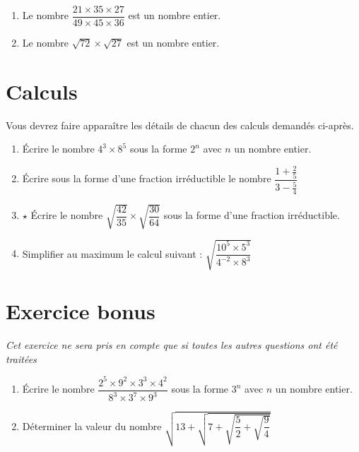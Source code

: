\documentclass[oneside,12pt]{exam}          %
\begin{document}
\begin{enumerate}[label=\underline{Affirmation \no \arabic*} : ,leftmargin=* , itemsep=1mm]
	\item Le nombre $\dfrac{21 \times 35 \times 27}{49 \times 45 \times 36}$ est un nombre entier.
	\item Le nombre $\sqrt{72} \times \sqrt{27}$ est un nombre entier.
\end{enumerate}



\section{Calculs}
Vous devrez faire apparaître les détails de chacun des calculs demandés ci-après.
\begin{enumerate}
	\item Écrire le nombre $4^3 \times 8^5$ sous la forme $2^n$ avec $n$ un nombre entier.
	\item Écrire sous la forme d'une fraction irréductible le nombre $\dfrac{1 + \frac{2}{5}}{3 - \frac{5}{4}}$
	\item $\star$ Écrire le nombre $\sqrt{\dfrac{42}{35}} \times \sqrt{\dfrac{30}{64}}$ sous la forme d'une fraction irréductible.
	\item Simplifier au maximum le calcul suivant : $\sqrt{\dfrac{10^5 \times 5^3 }{4^{-2} \times 8^3}}$
\end{enumerate}



\section*{Exercice bonus}
\textit{Cet exercice ne sera pris en compte que si toutes les autres questions ont été traitées}
\begin{enumerate}
	\item Écrire le nombre $\dfrac{2^5\times9^2\times3^3\times4^2}{8^3\times3^7\times9^3}$ sous la forme $3^n$ avec $n$ un nombre entier.
	\item Déterminer la valeur du nombre $\sqrt{13 + \sqrt{ 7 + \sqrt{\dfrac{5}{2} + \sqrt{\dfrac{9}{4}}}}}$
\end{enumerate}



\newpage
{}
\setcounter{section}{0}
\color{newblue}
\end{document}
